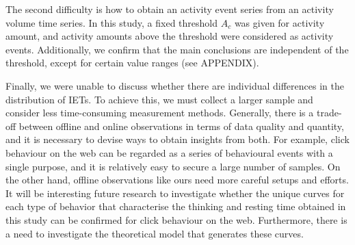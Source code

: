 \documentclass{bmcart}
\begin{document}
The second difficulty is how to obtain an activity event series from an activity volume time series. 
In this study, a fixed threshold $A_c$ was given for activity amount, and activity amounts above the threshold were considered as activity events. Additionally, we confirm that the main conclusions are independent of the threshold, except for certain value ranges (see APPENDIX).

Finally, we were unable to discuss whether there are individual differences in the distribution of IETs. To achieve this, we must collect a larger sample and consider less time-consuming measurement methods.
Generally, there is a trade-off between offline and online observations in terms of data quality and quantity, and it is necessary to devise ways to obtain insights from both. 
For example, click behaviour on the web can be regarded as a series of behavioural events with a single purpose, and it is relatively easy to secure a large number of samples. On the other hand, offline observations like ours need more careful setups and efforts.
It will be interesting future research to investigate whether the unique curves for each type of behavior that characterise the thinking and resting time obtained in this study can be confirmed for click behaviour on the web. Furthermore, there is a need to investigate the theoretical model that generates these curves.




\end{document}
